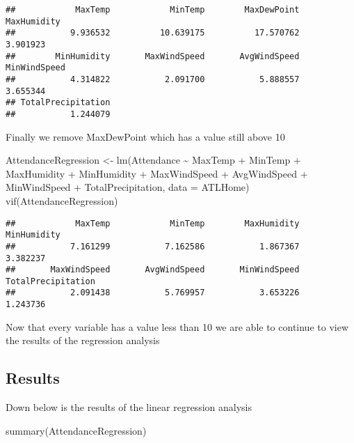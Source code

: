 \documentclass[
]{article}
\newenvironment{Shaded}{\begin{snugshade}}{\end{snugshade}}
\newcommand{\AttributeTok}[1]{\textcolor[rgb]{0.77,0.63,0.00}{#1}}
\newcommand{\FunctionTok}[1]{\textcolor[rgb]{0.00,0.00,0.00}{#1}}
\newcommand{\NormalTok}[1]{#1}
\newcommand{\OtherTok}[1]{\textcolor[rgb]{0.56,0.35,0.01}{#1}}
\newcommand{\SpecialCharTok}[1]{\textcolor[rgb]{0.00,0.00,0.00}{#1}}
\begin{document}
\begin{verbatim}
##            MaxTemp            MinTemp        MaxDewPoint        MaxHumidity 
##           9.936532          10.639175          17.570762           3.901923 
##        MinHumidity       MaxWindSpeed       AvgWindSpeed       MinWindSpeed 
##           4.314822           2.091700           5.888557           3.655344 
## TotalPrecipitation 
##           1.244079
\end{verbatim}

Finally we remove MaxDewPoint which has a value still above 10

\begin{Shaded}
\begin{Highlighting}[]
\NormalTok{AttendanceRegression }\OtherTok{\textless{}{-}} \FunctionTok{lm}\NormalTok{(Attendance }\SpecialCharTok{\textasciitilde{}}\NormalTok{ MaxTemp }\SpecialCharTok{+}\NormalTok{ MinTemp }\SpecialCharTok{+}\NormalTok{ MaxHumidity }\SpecialCharTok{+}\NormalTok{ MinHumidity }\SpecialCharTok{+}\NormalTok{ MaxWindSpeed }\SpecialCharTok{+}\NormalTok{ AvgWindSpeed }\SpecialCharTok{+}\NormalTok{ MinWindSpeed }\SpecialCharTok{+}\NormalTok{ TotalPrecipitation, }\AttributeTok{data =}\NormalTok{ ATLHome)}
\FunctionTok{vif}\NormalTok{(AttendanceRegression)}
\end{Highlighting}
\end{Shaded}

\begin{verbatim}
##            MaxTemp            MinTemp        MaxHumidity        MinHumidity 
##           7.161299           7.162586           1.867367           3.382237 
##       MaxWindSpeed       AvgWindSpeed       MinWindSpeed TotalPrecipitation 
##           2.091438           5.769957           3.653226           1.243736
\end{verbatim}

Now that every variable has a value less than 10 we are able to continue
to view the results of the regression analysis

\hypertarget{results}{%
\subsection{Results}\label{results}}

Down below is the results of the linear regression analysis

\begin{Shaded}
\begin{Highlighting}[]
\FunctionTok{summary}\NormalTok{(AttendanceRegression)}
\end{Highlighting}
\end{Shaded}
\end{document}
